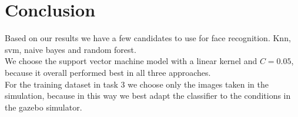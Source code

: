 \documentclass[12pt,a4paper]{article}
\begin{document}
    \section{Conclusion}

    Based on our results we have a few candidates to use for face recognition. Knn, svm, naive bayes and random forest. \\

    We choose the support vector machine model with a linear kernel and $C=0.05$, because it overall performed best in all three approaches. \\

    For the training dataset in task 3 we choose only the images taken in the simulation, because in this way we best adapt the classifier to the conditions in the gazebo simulator.
    
\end{document}
